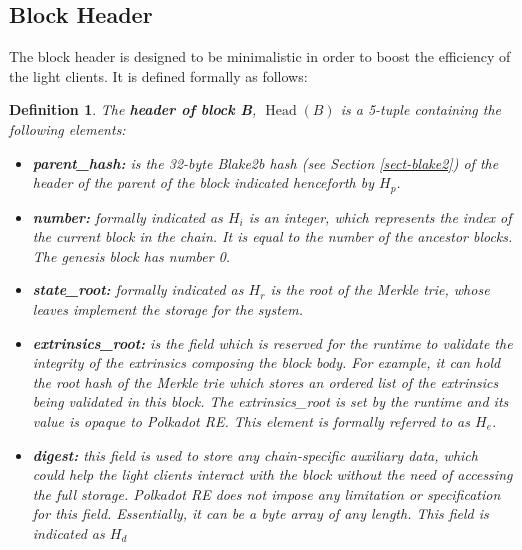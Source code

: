 \documentclass{article}
\newcommand{\tmop}[1]{\ensuremath{\operatorname{#1}}}
\newcommand{\tmsamp}[1]{\textsf{#1}}
\newcommand{\tmstrong}[1]{\textbf{#1}}
\newcommand{\tmtextbf}[1]{{\bfseries{#1}}}
\newcommand{\tmtextsf}[1]{{\sffamily{#1}}}
\newtheorem{definition}{Definition}
\providecommand{\tmop}[1]{\ensuremath{\mathrm{#1}}}
\providecommand{\tmsamp}[1]{\tmtextsf{#1}}
\providecommand{\tmstrong}[1]{\tmtextbf{#1}}
\providecommand{\tmtextbf}[1]{\tmtextbf{#1}}
\newtheorem{definition}{Definition}
\begin{document}
\subsection{Block Header}\label{block}

The block header is designed to be minimalistic in order to boost the
efficiency of the light clients. It is defined formally as follows:

\begin{definition}
  \label{defn-block-header}The {\tmstrong{header of block B}},
  {\tmstrong{$\tmop{Head} (B)$}} is a 5-tuple containing the following
  elements:
  \begin{itemize}
    \item \tmtextbf{{\tmsamp{parent\_hash:}}} is the 32-byte Blake2b hash (see
    Section \ref{sect-blake2}) of the header of the parent of the block
    indicated henceforth by \tmtextbf{$H_p$}.
    
    \item {\tmstrong{{\tmsamp{number:}}}} formally indicated as
    {\tmstrong{$H_i$}} is an integer, which represents the index of the
    current block in the chain. It is equal to the number of the ancestor
    blocks. The genesis block has number 0.
    
    \item {\tmstrong{{\tmsamp{state\_root:}}}} formally indicated as
    {\tmstrong{$H_r$}} is the root of the Merkle trie, whose leaves implement
    the storage for the system.
    
    \item {\tmstrong{{\tmsamp{extrinsics\_root:}}}} is the field which is
    reserved for the runtime to validate the integrity of the extrinsics
    composing the block body. For example, it can hold the root hash of the
    Merkle trie which stores an ordered list of the extrinsics being validated
    in this block. The {\tmsamp{extrinsics\_root}} is set by the runtime and
    its value is opaque to Polkadot RE. This element is formally referred to
    as {\tmstrong{$H_e$}}.
    
    \item {\tmstrong{{\tmsamp{digest:}}}} this field is used to store any
    chain-specific auxiliary data, which could help the light clients interact
    with the block without the need of accessing the full storage. Polkadot RE
    does not impose any limitation or specification for this field.
    Essentially, it can be a byte array of any length. This field is indicated
    as {\tmstrong{$H_d$}}
  \end{itemize}
\end{definition}
\end{document}
